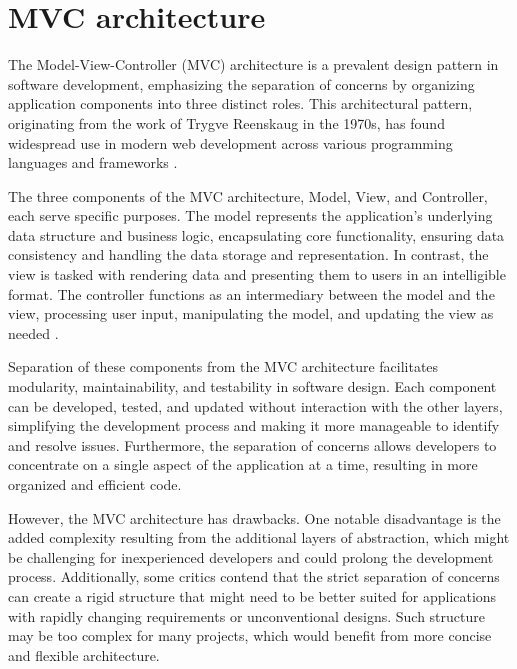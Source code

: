 \section*{MVC architecture}
The Model-View-Controller (MVC) architecture is a prevalent design pattern in
software development, emphasizing the separation of concerns by organizing
application components into three distinct roles. This architectural pattern,
originating from the work of Trygve Reenskaug in the 1970s, has found widespread
use in modern web development across various programming languages and
frameworks \cite{TheDCIArchitecture_2009}.

The three components of the MVC architecture, Model, View, and Controller, each
serve specific purposes. The model represents the application's underlying data
structure and business logic, encapsulating core functionality, ensuring data
consistency and handling the data storage and representation. In contrast, the
view is tasked with rendering data and presenting them to users in an
intelligible format. The controller functions as an intermediary between the
model and the view, processing user input, manipulating the model, and updating
the view as needed \cite[p. 330]{fowler-patterns-2003}.

Separation of these components from the MVC architecture facilitates modularity,
maintainability, and testability in software design. Each component can be
developed, tested, and updated without interaction with the other layers,
simplifying the development process and making it more manageable to identify
and resolve issues. Furthermore, the separation of concerns allows developers to
concentrate on a single aspect of the application at a time, resulting in more
organized and efficient code.

However, the MVC architecture has drawbacks. One notable disadvantage is the
added complexity resulting from the additional layers of abstraction, which
might be challenging for inexperienced developers and could prolong the
development process. Additionally, some critics contend that the strict
separation of concerns can create a rigid structure that might need to be better
suited for applications with rapidly changing requirements or unconventional
designs. Such structure may be too complex for many projects, which would
benefit from more concise and flexible architecture.
